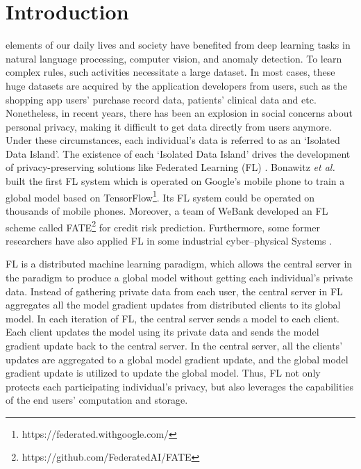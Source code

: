 \documentclass[lettersize,journal]{IEEEtran}
\begin{document}
\section{Introduction}
 elements of our daily lives and society have benefited from deep learning tasks in natural language processing, computer vision, and anomaly detection. To learn complex rules, such activities necessitate a large dataset. In most cases, these huge datasets are acquired by the application developers from users, such as the shopping app users' purchase record data, patients' clinical data and etc. Nonetheless, in recent years, there has been an explosion in social concerns about personal privacy, making it difficult to get data directly from users anymore. Under these circumstances, each individual's data is referred to as an `Isolated Data Island'. The existence of each `Isolated Data Island' drives the development of privacy-preserving solutions like Federated Learning (FL) \cite{ref_01_GoogleFL,ref_02_FLConcept,li2021a}. Bonawitz \textit{et al.} built the first FL system which is operated on Google's mobile phone to train a global model based on TensorFlow\footnote{https://federated.withgoogle.com/}. Its FL system could be operated on thousands of mobile phones. Moreover, a team of WeBank developed an FL scheme called FATE\footnote{https://github.com/FederatedAI/FATE} for credit risk prediction. Furthermore, some former researchers have also applied FL in some industrial cyber–physical Systems \cite{ref_42_FLApp, ref_43_FLApp, hao2020hao}.

\par FL is a distributed machine learning paradigm, which allows the central server in the paradigm to produce a global model without getting each individual's private data. Instead of gathering private data from each user, the central server in FL aggregates all the model gradient updates from distributed clients to its global model. In each iteration of FL, the central server sends a model to each client. Each client updates the model using its private data and sends the model gradient update back to the central server. In the central server, all the clients' updates are aggregated to a global model gradient update, and the global model gradient update is utilized to update the global model. Thus, FL not only protects each participating individual's privacy, but also leverages the capabilities of the end users' computation and storage.
\end{document}
